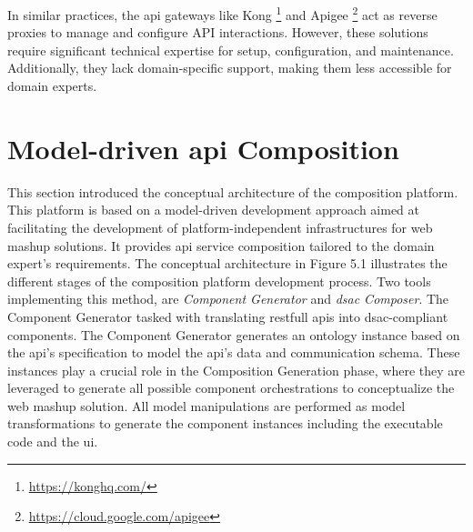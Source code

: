 In similar practices, the \gls{api} gateways like Kong  \footnote{\url{https://konghq.com/}} and Apigee \footnote{\url{https://cloud.google.com/apigee}} act as reverse proxies to manage and configure API interactions. However, these solutions require significant technical expertise for setup, configuration, and maintenance. Additionally, they lack domain-specific support, making them less accessible for domain experts.


\vspace{-15pt}
\hypertarget{sec:md-API-c}{%
\section{Model-driven \gls{api} Composition}\label{sec:md-API-c}}
\vspace{15pt}

This section introduced the conceptual architecture of the composition
platform. This platform is based on a model-driven development approach
aimed at facilitating the development of platform-independent
infrastructures for web mashup solutions. It provides \gls{api} service
composition tailored to the domain expert's
requirements. The conceptual architecture in Figure 5.1 illustrates the
different stages of the composition platform development process. Two
tools implementing this method, are \emph{Component Generator} and
\emph{\gls{dsac} Composer}. The Component Generator tasked with translating
\gls{rest}full \gls{api}s into \gls{dsac}-compliant components. The Component Generator
generates an ontology instance based on the \gls{api}'s specification to model
the \gls{api}'s data and communication schema. These instances play a crucial
role in the Composition Generation phase, where they are leveraged to
generate all possible component orchestrations to conceptualize the web
mashup solution. All model manipulations are performed as model
transformations to generate the component instances including the
executable code and the \gls{ui}.

